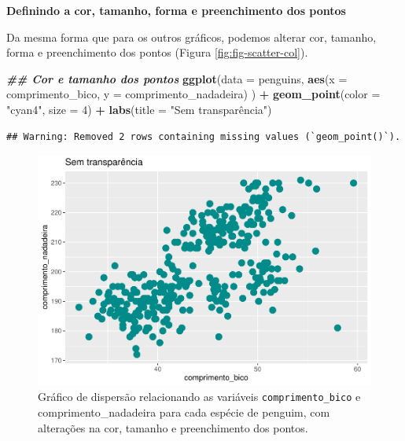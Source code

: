 \documentclass[
]{article}
\newenvironment{Shaded}{\begin{snugshade}}{\end{snugshade}}
\newcommand{\AttributeTok}[1]{\textcolor[rgb]{0.13,0.29,0.53}{#1}}
\newcommand{\DecValTok}[1]{\textcolor[rgb]{0.00,0.00,0.81}{#1}}
\newcommand{\DocumentationTok}[1]{\textcolor[rgb]{0.56,0.35,0.01}{\textbf{\textit{#1}}}}
\newcommand{\FunctionTok}[1]{\textcolor[rgb]{0.13,0.29,0.53}{\textbf{#1}}}
\newcommand{\NormalTok}[1]{#1}
\newcommand{\SpecialCharTok}[1]{\textcolor[rgb]{0.81,0.36,0.00}{\textbf{#1}}}
\newcommand{\StringTok}[1]{\textcolor[rgb]{0.31,0.60,0.02}{#1}}
\begin{document}
\textbf{Definindo a cor, tamanho, forma e preenchimento dos pontos}

Da mesma forma que para os outros gráficos, podemos alterar cor, tamanho, forma e preenchimento dos pontos (Figura \ref{fig:fig-scatter-col}).

\begin{Shaded}
\begin{Highlighting}[]
\DocumentationTok{\#\# Cor e tamanho dos pontos }
\FunctionTok{ggplot}\NormalTok{(}\AttributeTok{data =}\NormalTok{ penguins, }
       \FunctionTok{aes}\NormalTok{(}\AttributeTok{x =}\NormalTok{ comprimento\_bico, }\AttributeTok{y =}\NormalTok{ comprimento\_nadadeira)}
\NormalTok{       ) }\SpecialCharTok{+}
    \FunctionTok{geom\_point}\NormalTok{(}\AttributeTok{color =} \StringTok{"cyan4"}\NormalTok{, }\AttributeTok{size =} \DecValTok{4}\NormalTok{) }\SpecialCharTok{+} 
    \FunctionTok{labs}\NormalTok{(}\AttributeTok{title =} \StringTok{"Sem transparência"}\NormalTok{)}
\end{Highlighting}
\end{Shaded}

\begin{verbatim}
## Warning: Removed 2 rows containing missing values (`geom_point()`).
\end{verbatim}

\begin{figure}
\centering
\includegraphics{epr_files/figure-latex/fig-scatter-col-1.pdf}
\caption{\label{fig:fig-scatter-col-1}Gráfico de dispersão relacionando as variáveis \texttt{comprimento\_bico} e comprimento\_nadadeira para cada espécie de penguim, com alterações na cor, tamanho e preenchimento dos pontos.}
\end{figure}
\end{document}

